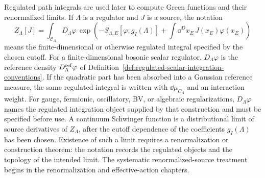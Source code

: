 \begin{definition}
\label{def:volume-ii-regulated-functional-integral-notation}
Regulated path integrals are used later to compute Green functions and their
renormalized limits.  If \(\Lambda\) is a regulator and \(J\) is a source, the
notation
\[
  Z_\Lambda[J]
  =
  \int_{\mathcal C_\Lambda}D_\Lambda\varphi\,
  \exp\left(
    -S_{\Lambda,E}[\varphi;g_I(\Lambda)]
    +\int \dd^D x_E\,J(x_E)\varphi(x_E)
  \right)
\]
means the finite-dimensional or otherwise regulated integral specified by the
chosen cutoff.  For a finite-dimensional bosonic scalar regulator,
\(D_\Lambda\varphi\) is the reference density
\(D_\Lambda^{\rm ref}\varphi\) of
Definition~\ref{def:regulated-scalar-integration-conventions}.  If the
quadratic part has been absorbed into a Gaussian reference measure, the same
regulated integral is written with \(\dd\mu_{C_\Lambda}\) and an interaction
weight.  For gauge, fermionic, oscillatory, BV, or algebraic regularizations,
\(D_\Lambda\varphi\) names the regulated integration object supplied by that
construction and must be specified before use.  A continuum Schwinger function
is a distributional limit of source derivatives of \(Z_\Lambda\), after the
cutoff dependence of the coefficients \(g_I(\Lambda)\) has been chosen.
Existence of such a limit requires a renormalization or construction theorem:
the notation records the regulated objects and the topology of the intended
limit.
The systematic renormalized-source treatment begins in the renormalization and
effective-action chapters.
\end{definition}
